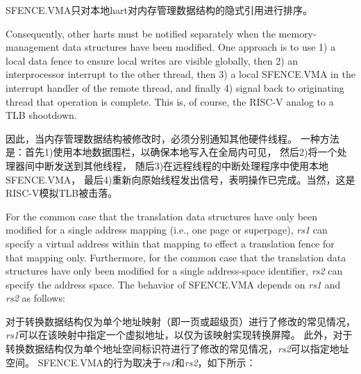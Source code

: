 SFENCE.VMA只对本地hart对内存管理数据结构的隐式引用进行排序。

\begin{commentary}
Consequently, other harts must be notified separately when the
memory-management data structures have been modified.
One approach is to use 1)
a local data fence to ensure local writes are visible globally, then
2) an interprocessor interrupt to the other thread, then 3) a local
SFENCE.VMA in the interrupt handler of the remote thread, and finally
4) signal back to originating thread that operation is complete.  This
is, of course, the RISC-V analog to a TLB shootdown.

因此，当内存管理数据结构被修改时，必须分别通知其他硬件线程。
一种方法是：首先1)使用本地数据围栏，以确保本地写入在全局内可见，
然后2)将一个处理器间中断发送到其他线程，
随后3)在远程线程的中断处理程序中使用本地SFENCE.VMA，
最后4)重新向原始线程发出信号，表明操作已完成。当然，这是RISC-V模拟TLB被击落。  

\end{commentary}

For the common case that the translation data structures have only been
modified for a single address mapping (i.e., one page or superpage), {\em rs1}
can specify a virtual address within that mapping to effect a translation
fence for that mapping only.  Furthermore, for the common case that the
translation data structures have only been modified for a single address-space
identifier, {\em rs2} can specify the address space.  The behavior of
SFENCE.VMA depends on {\em rs1} and {\em rs2} as follows:

对于转换数据结构仅为单个地址映射（即一页或超级页）进行了修改的常见情况，
{\em rs1}可以在该映射中指定一个虚拟地址，以仅为该映射实现转换屏障。
此外，对于转换数据结构仅为单个地址空间标识符进行了修改的常见情况，{\em rs2}可以指定地址空间。
SFENCE.VMA的行为取决于{\em rs1}和{\em rs2}，如下所示：


